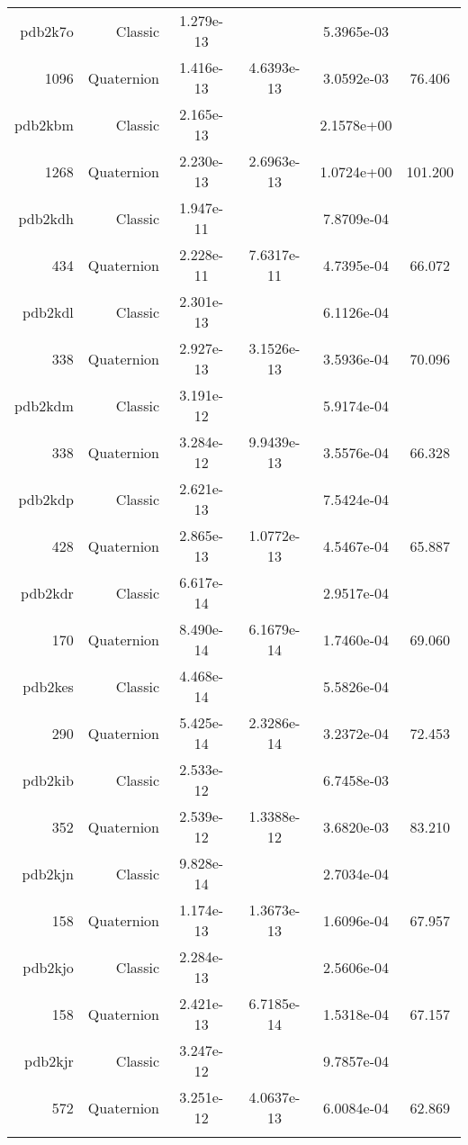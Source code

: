 \begin{xltabular}{\textwidth}{r|rS[table-format=1.3e+2]S[table-format=1.4e+2]S[table-format=1.4e+2]S[table-format=-1.3]}
pdb2k7o & Classic & 1.279e-13 &  & 5.3965e-03 & \\
1096 & Quaternion & 1.416e-13 & 4.6393e-13 & 3.0592e-03 & 76.406\\  \addlinespace
pdb2kbm & Classic & 2.165e-13 &  & 2.1578e+00 & \\
1268 & Quaternion & 2.230e-13 & 2.6963e-13 & 1.0724e+00 & 101.200\\  \addlinespace
pdb2kdh & Classic & 1.947e-11 &  & 7.8709e-04 & \\
434 & Quaternion & 2.228e-11 & 7.6317e-11 & 4.7395e-04 & 66.072\\  \addlinespace
pdb2kdl & Classic & 2.301e-13 &  & 6.1126e-04 & \\
338 & Quaternion & 2.927e-13 & 3.1526e-13 & 3.5936e-04 & 70.096\\  \addlinespace
pdb2kdm & Classic & 3.191e-12 &  & 5.9174e-04 & \\
338 & Quaternion & 3.284e-12 & 9.9439e-13 & 3.5576e-04 & 66.328\\  \addlinespace
pdb2kdp & Classic & 2.621e-13 &  & 7.5424e-04 & \\
428 & Quaternion & 2.865e-13 & 1.0772e-13 & 4.5467e-04 & 65.887\\  \addlinespace
pdb2kdr & Classic & 6.617e-14 &  & 2.9517e-04 & \\
170 & Quaternion & 8.490e-14 & 6.1679e-14 & 1.7460e-04 & 69.060\\  \addlinespace
pdb2kes & Classic & 4.468e-14 &  & 5.5826e-04 & \\
290 & Quaternion & 5.425e-14 & 2.3286e-14 & 3.2372e-04 & 72.453\\  \addlinespace
pdb2kib & Classic & 2.533e-12 &  & 6.7458e-03 & \\
352 & Quaternion & 2.539e-12 & 1.3388e-12 & 3.6820e-03 & 83.210\\  \addlinespace
pdb2kjn & Classic & 9.828e-14 &  & 2.7034e-04 & \\
158 & Quaternion & 1.174e-13 & 1.3673e-13 & 1.6096e-04 & 67.957\\  \addlinespace
pdb2kjo & Classic & 2.284e-13 &  & 2.5606e-04 & \\
158 & Quaternion & 2.421e-13 & 6.7185e-14 & 1.5318e-04 & 67.157\\  \addlinespace
pdb2kjr & Classic & 3.247e-12 &  & 9.7857e-04 & \\
572 & Quaternion & 3.251e-12 & 4.0637e-13 & 6.0084e-04 & 62.869\\  \addlinespace

\end{xltabular}
